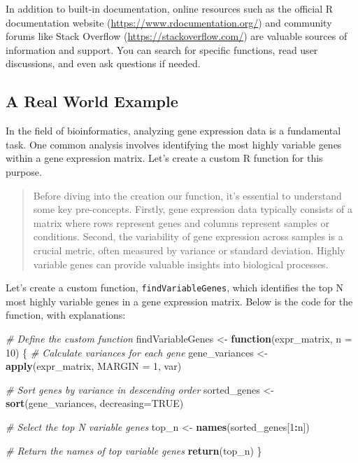 \documentclass[
]{book}
\newenvironment{Shaded}{\begin{snugshade}}{\end{snugshade}}
\newcommand{\AttributeTok}[1]{\textcolor[rgb]{0.13,0.29,0.53}{#1}}
\newcommand{\CommentTok}[1]{\textcolor[rgb]{0.56,0.35,0.01}{\textit{#1}}}
\newcommand{\ConstantTok}[1]{\textcolor[rgb]{0.56,0.35,0.01}{#1}}
\newcommand{\ControlFlowTok}[1]{\textcolor[rgb]{0.13,0.29,0.53}{\textbf{#1}}}
\newcommand{\DecValTok}[1]{\textcolor[rgb]{0.00,0.00,0.81}{#1}}
\newcommand{\FunctionTok}[1]{\textcolor[rgb]{0.13,0.29,0.53}{\textbf{#1}}}
\newcommand{\NormalTok}[1]{#1}
\newcommand{\OtherTok}[1]{\textcolor[rgb]{0.56,0.35,0.01}{#1}}
\newcommand{\SpecialCharTok}[1]{\textcolor[rgb]{0.81,0.36,0.00}{\textbf{#1}}}
\begin{document}
In addition to built-in documentation, online resources such as the official R documentation website (\url{https://www.rdocumentation.org/}) and community forums like Stack Overflow (\url{https://stackoverflow.com/}) are valuable sources of information and support. You can search for specific functions, read user discussions, and even ask questions if needed.

\hypertarget{a-real-world-example-1}{%
\subsection{A Real World Example}\label{a-real-world-example-1}}

In the field of bioinformatics, analyzing gene expression data is a fundamental task. One common analysis involves identifying the most highly variable genes within a gene expression matrix. Let's create a custom R function for this purpose.

\begin{quote}
Before diving into the creation our function, it's essential to understand some key pre-concepts. Firstly, gene expression data typically consists of a matrix where rows represent genes and columns represent samples or conditions. Second, the variability of gene expression across samples is a crucial metric, often measured by variance or standard deviation. Highly variable genes can provide valuable insights into biological processes.
\end{quote}

Let's create a custom function, \texttt{findVariableGenes}, which identifies the top N most highly variable genes in a gene expression matrix. Below is the code for the function, with explanations:

\begin{Shaded}
\begin{Highlighting}[]
\CommentTok{\# Define the custom function}
\NormalTok{findVariableGenes }\OtherTok{\textless{}{-}} \ControlFlowTok{function}\NormalTok{(expr\_matrix, }\AttributeTok{n =} \DecValTok{10}\NormalTok{) \{}
  \CommentTok{\# Calculate variances for each gene}
\NormalTok{  gene\_variances }\OtherTok{\textless{}{-}} \FunctionTok{apply}\NormalTok{(expr\_matrix, }\AttributeTok{MARGIN =} \DecValTok{1}\NormalTok{, var)}
  
  \CommentTok{\# Sort genes by variance in descending order}
\NormalTok{  sorted\_genes }\OtherTok{\textless{}{-}} \FunctionTok{sort}\NormalTok{(gene\_variances, }\AttributeTok{decreasing=}\ConstantTok{TRUE}\NormalTok{) }
  
  \CommentTok{\# Select the top N variable genes}
\NormalTok{  top\_n }\OtherTok{\textless{}{-}} \FunctionTok{names}\NormalTok{(sorted\_genes[}\DecValTok{1}\SpecialCharTok{:}\NormalTok{n])}
  
  \CommentTok{\# Return the names of top variable genes}
  \FunctionTok{return}\NormalTok{(top\_n)}
\NormalTok{\}}
\end{Highlighting}
\end{Shaded}
\end{document}
